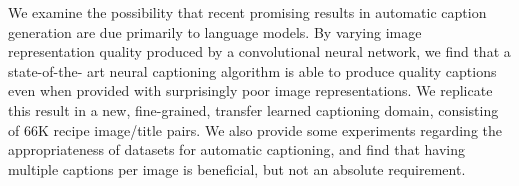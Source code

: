 We examine the possibility that recent promising results in automatic caption generation are due primarily to language models. By varying image representation quality produced by a convolutional neural network, we find that a state-of-the- art neural captioning algorithm is able to produce quality captions even when provided with surprisingly poor image representations. We replicate this result in a new, fine-grained, transfer learned captioning domain, consisting of 66K recipe image/title pairs. We also provide some experiments regarding the appropriateness of datasets for automatic captioning, and find that having multiple captions per image is beneficial, but not an absolute requirement.
